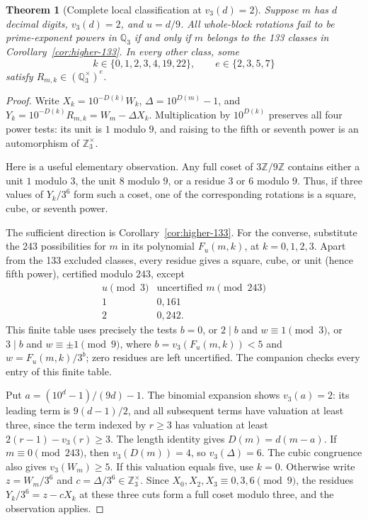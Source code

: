 \documentclass[10pt]{article}
\newtheorem{theorem}{Theorem}
\begin{document}
\begin{theorem}[Complete local classification at $v_3(d)=2$]\label{thm:h2-complete}
Suppose $m$ has $d$ decimal digits, $v_3(d)=2$, and $u=d/9$.
All whole-block rotations fail to be prime-exponent powers in $\mathbb Q_3$
if and only if $m$ belongs to the 133 classes in
Corollary~\ref{cor:higher-133}. In every other class, some
\[
 k\in\{0,1,2,3,4,19,22\},\qquad e\in\{2,3,5,7\}
\]
satisfy $R_{m,k}\in(\mathbb Q_3^\times)^e$.
\end{theorem}
\begin{proof}
Write $X_k=10^{-D(k)}W_k$, $\Delta=10^{D(m)}-1$, and
$Y_k=10^{-D(k)}R_{m,k}=W_m-\Delta X_k$.
Multiplication by $10^{D(k)}$ preserves all four power tests:
its unit is $1$ modulo $9$, and raising to the fifth or seventh power
is an automorphism of $\mathbb Z_3^\times$.

Here is a useful elementary observation. Any full coset of
$3\mathbb Z/9\mathbb Z$ contains either a unit $1$ modulo $3$,
the unit $8$ modulo $9$, or a residue $3$ or $6$ modulo $9$.
Thus, if three values of $Y_k/3^6$ form such a coset, one of the
corresponding rotations is a square, cube, or seventh power.

The sufficient direction is Corollary~\ref{cor:higher-133}.
For the converse, substitute the 243 possibilities for $m$ in its
polynomial $F_u(m,k)$, at $k=0,1,2,3$. Apart from the 133 excluded
classes, every residue gives a square, cube, or unit (hence fifth
power), certified modulo $243$, except
\[
\begin{array}{c|c}
u\pmod3&\text{uncertified }m\pmod{243}\\\hline
1&0,161\\
2&0,242.
\end{array}
\]
This finite table uses precisely the tests
$b=0$, or $2\mid b$ and $w\equiv1\pmod3$, or
$3\mid b$ and $w\equiv\pm1\pmod9$, where
$b=v_3(F_u(m,k))<5$ and $w=F_u(m,k)/3^b$;
zero residues are left uncertified. The companion
 checks every entry of this finite table.

Put $a=(10^d-1)/(9d)-1$. The binomial expansion shows
$v_3(a)=2$: its leading term is $9(d-1)/2$, and all subsequent
terms have valuation at least three, since the term indexed by $r\ge3$ has valuation at least $2(r-1)-v_3(r)\ge3$. The length identity gives
$D(m)=d(m-a)$.
If $m\equiv0\pmod{243}$, then $v_3(D(m))=4$, so $v_3(\Delta)=6$.
The cubic congruence also gives $v_3(W_m)\ge5$.
If this valuation equals five, use $k=0$. Otherwise write
$z=W_m/3^6$ and $c=\Delta/3^6\in\mathbb Z_3^\times$.
Since $X_0,X_2,X_3\equiv0,3,6\pmod9$, the residues
$Y_k/3^6=z-cX_k$ at these three cuts form a full coset modulo three,
and the observation applies.


\end{proof}
\end{document}
